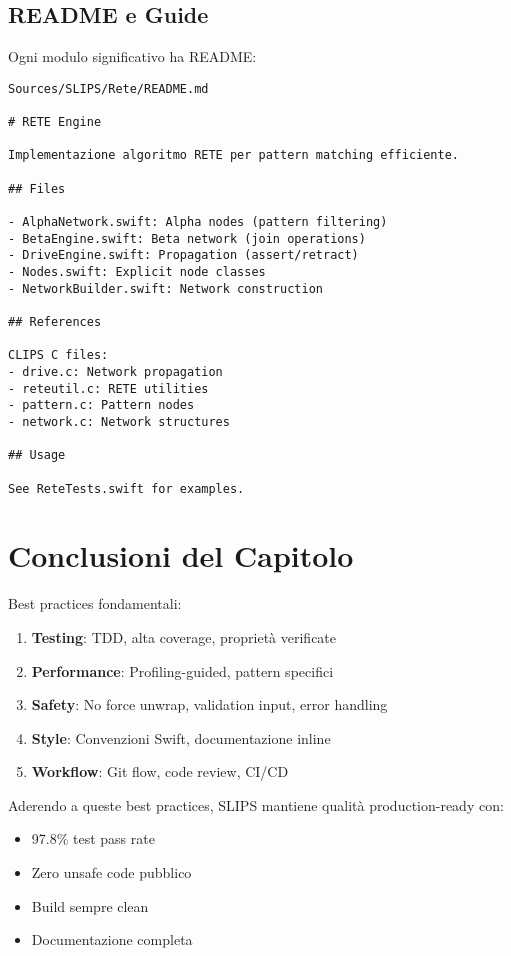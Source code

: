 \subsection{README e Guide}

Ogni modulo significativo ha README:

\begin{verbatim}
Sources/SLIPS/Rete/README.md

# RETE Engine

Implementazione algoritmo RETE per pattern matching efficiente.

## Files

- AlphaNetwork.swift: Alpha nodes (pattern filtering)
- BetaEngine.swift: Beta network (join operations)
- DriveEngine.swift: Propagation (assert/retract)
- Nodes.swift: Explicit node classes
- NetworkBuilder.swift: Network construction

## References

CLIPS C files:
- drive.c: Network propagation
- reteutil.c: RETE utilities
- pattern.c: Pattern nodes
- network.c: Network structures

## Usage

See ReteTests.swift for examples.
\end{verbatim}

\section{Conclusioni del Capitolo}

Best practices fondamentali:

\begin{enumerate}
\item \textbf{Testing}: TDD, alta coverage, proprietà verificate
\item \textbf{Performance}: Profiling-guided, pattern specifici
\item \textbf{Safety}: No force unwrap, validation input, error handling
\item \textbf{Style}: Convenzioni Swift, documentazione inline
\item \textbf{Workflow}: Git flow, code review, CI/CD
\end{enumerate}

\begin{successbox}
Aderendo a queste best practices, SLIPS mantiene qualità production-ready con:
\begin{itemize}
\item 97.8\% test pass rate
\item Zero unsafe code pubblico
\item Build sempre clean
\item Documentazione completa
\end{itemize}
\end{successbox}

